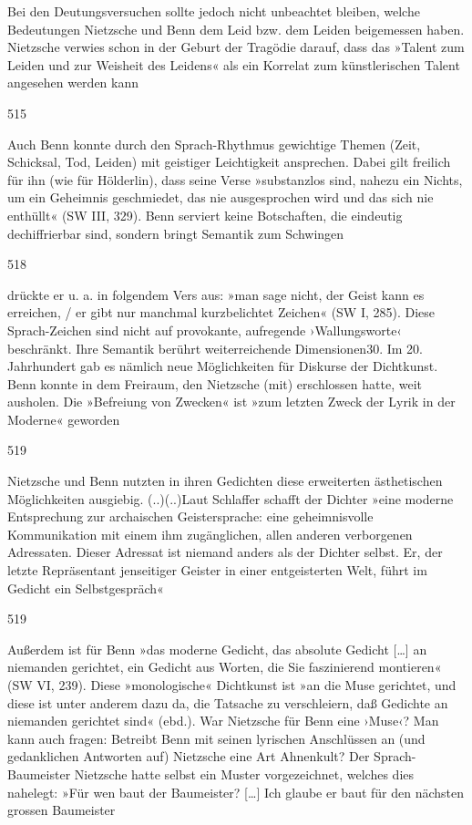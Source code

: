 \documentclass[
  letterpaper,
  DIV=11,
  numbers=noendperiod]{scrartcl}
\begin{document}
Bei den Deutungsversuchen sollte jedoch nicht unbeachtet bleiben, welche
Bedeutungen Nietzsche und Benn dem Leid bzw. dem Leiden beigemessen
haben. Nietzsche verwies schon in der Geburt der Tragödie darauf, dass
das »Talent zum Leiden und zur Weisheit des Leidens« als ein Korrelat
zum künstlerischen Talent angesehen werden kann

515

Auch Benn konnte durch den Sprach-Rhythmus gewichtige Themen (Zeit,
Schicksal, Tod, Leiden) mit geistiger Leichtigkeit ansprechen. Dabei
gilt freilich für ihn (wie für Hölderlin), dass seine Verse »substanzlos
sind, nahezu ein Nichts, um ein Geheimnis geschmiedet, das nie
ausgesprochen wird und das sich nie enthüllt« (SW III, 329). Benn
serviert keine Botschaften, die eindeutig dechiffrierbar sind, sondern
bringt Semantik zum Schwingen

518

drückte er u. a. in folgendem Vers aus: »man sage nicht, der Geist kann
es erreichen, / er gibt nur manchmal kurzbelichtet Zeichen« (SW I, 285).
Diese Sprach-Zeichen sind nicht auf provokante, aufregende
›Wallungsworte‹ beschränkt. Ihre Semantik berührt weiterreichende
Dimensionen30. Im 20. Jahrhundert gab es nämlich neue Möglichkeiten für
Diskurse der Dichtkunst. Benn konnte in dem Freiraum, den Nietzsche
(mit) erschlossen hatte, weit ausholen. Die »Befreiung von Zwecken« ist
»zum letzten Zweck der Lyrik in der Moderne« geworden

519

Nietzsche und Benn nutzten in ihren Gedichten diese erweiterten
ästhetischen Möglichkeiten ausgiebig. (..)(..)Laut Schlaffer schafft der
Dichter »eine moderne Entsprechung zur archaischen Geistersprache: eine
geheimnisvolle Kommunikation mit einem ihm zugänglichen, allen anderen
verborgenen Adressaten. Dieser Adressat ist niemand anders als der
Dichter selbst. Er, der letzte Repräsentant jenseitiger Geister in einer
entgeisterten Welt, führt im Gedicht ein Selbstgespräch«

519

Außerdem ist für Benn »das moderne Gedicht, das absolute Gedicht
{[}\ldots{]} an niemanden gerichtet, ein Gedicht aus Worten, die Sie
faszinierend montieren« (SW VI, 239). Diese »monologische« Dichtkunst
ist »an die Muse gerichtet, und diese ist unter anderem dazu da, die
Tatsache zu verschleiern, daß Gedichte an niemanden gerichtet sind«
(ebd.). War Nietzsche für Benn eine ›Muse‹? Man kann auch fragen:
Betreibt Benn mit seinen lyrischen Anschlüssen an (und gedanklichen
Antworten auf) Nietzsche eine Art Ahnenkult? Der Sprach-Baumeister
Nietzsche hatte selbst ein Muster vorgezeichnet, welches dies nahelegt:
»Für wen baut der Baumeister? {[}\ldots{]} Ich glaube er baut für den
nächsten grossen Baumeister
\end{document}
